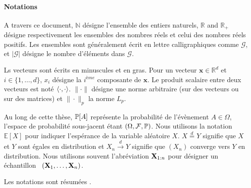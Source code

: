 \paragraph{Notations}

A travers ce document, $\mathbb{N}$ désigne l'ensemble des entiers naturels, $\mathbb{R}$ and $\mathbb{R}_+$ désigne respectivement les ensembles des nombres réels et celui des nombres réels positifs. Les ensembles  sont généralement écrit en lettre calligraphiques comme $\mathcal{G}$, et $|\mathcal{G}|$ désigne le nombre d'éléments dans $\mathcal{G}$. 

Ls vecteurs sont écrits en minuscules et en gras. Pour un vecteur $\mathbf{x}\in\mathbb{R}^d$ et $i\in \{1,\dots,d\}$, $x_i$ désigne la $i^{ème}$ composante de $\mathbf{x}$. Le produit scalaire entre deux vecteurs est noté $\left\langle \cdot,\cdot \right\rangle$. $\|\cdot\|$ désigne une norme arbitraire (sur des vecteurs ou sur des matrices) et $\|\cdot\|_p$ la norme $L_p$.

Au long de cette thèse, $\mathbb{P}[A]$ représente la probabilité de l'évènement $A\in \Omega$, l'espace de probabilité sous-jacent étant $(\Omega, \mathcal{F}, \mathbb{P})$. Nous utilisons la notation $\mathbb{E}[X]$ pour indiquer l'espérance de la variable aléatoire $X$. $X \overset{d}{=} Y$ signifie que $X$ et $Y$ sont égales en distribution et $X_n \overset{d}{\to} Y$ signifie que $(X_n)$ converge vers $Y$ en distribution. Nous utilisons souvent l'abréviation $\mathbf X_{1:n}$ pour désigner un échantillon \iid~$(\mathbf X_1,\ldots,\mathbf X_n)$.

Les notations sont résumées .

